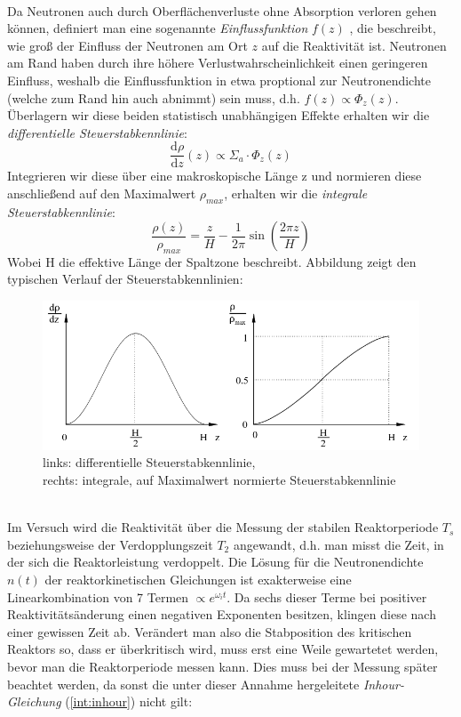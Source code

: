 	\ \\
	Da Neutronen auch durch Oberflächenverluste ohne Absorption verloren gehen können, definiert man eine sogenannte \textit{Einflussfunktion} $f(z)$ , die beschreibt, wie groß der Einfluss der Neutronen am Ort $z$ auf die Reaktivität ist. Neutronen am Rand haben durch ihre höhere Verlustwahrscheinlichkeit einen geringeren Einfluss, weshalb die Einflussfunktion in etwa proptional zur Neutronendichte (welche zum Rand hin auch abnimmt) sein muss, d.h. $f(z) \propto \Phi_z(z)$. Überlagern wir diese beiden statistisch unabhängigen Effekte erhalten wir die \textit{differentielle Steuerstabkennlinie}:\\
	$$\frac{\mathrm{d}\rho}{\mathrm{d}z}(z) \propto \Sigma_a \cdot \Phi_z(z)$$
	Integrieren wir diese über eine makroskopische Länge z und normieren diese anschließend auf den Maximalwert $\rho_{max}$, erhalten wir die \textit{integrale Steuerstabkennlinie}:
	$$\frac{\rho(z)}{\rho_{max}} = \frac{z}{H} - \frac{1}{2\pi} \sin{\left(\frac{2\pi z}{H}\right)}$$
	Wobei H die effektive Länge der Spaltzone beschreibt. Abbildung zeigt den typischen Verlauf der Steuerstabkennlinien:
		\begin{figure}[ht]
				\centering
				\captionsetup{justification=centering}
				\includegraphics[scale=0.4]{pic/sskl}
				\caption{links: differentielle Steuerstabkennlinie, 
						\\rechts: integrale, auf Maximalwert normierte Steuerstabkennlinie\cite{stab}}
				\label{int:NeutrFlDichte}
		\end{figure}
	\ \\
	Im Versuch wird die Reaktivität über die Messung der stabilen Reaktorperiode $T_s$ beziehungsweise der Verdopplungszeit $T_2$ angewandt, d.h. man misst die Zeit, in der sich die Reaktorleistung verdoppelt. Die Lösung für die Neutronendichte $n(t)$ der reaktorkinetischen Gleichungen ist exakterweise eine Linearkombination von 7 Termen $\propto e^{\omega_i t}$. Da sechs dieser Terme bei positiver Reaktivitätsänderung einen negativen Exponenten besitzen, klingen diese nach einer gewissen Zeit ab. Verändert man also die Stabposition des kritischen Reaktors so, dass er überkritisch wird, muss erst eine Weile gewartetet werden, bevor man die Reaktorperiode messen kann. Dies muss bei der Messung später beachtet werden, da sonst die unter dieser Annahme hergeleitete \textit{Inhour-Gleichung} (\ref{int:inhour}) nicht gilt:
